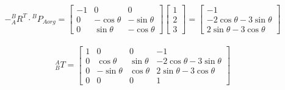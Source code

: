 \documentclass{article}
\begin{document}
\[
    -{}^{B}_{A}R^{T} \cdot {}^{B}P_{Aorg}
    =
    \begin{bmatrix}
        -1 & 0 & 0 \\
        0 & -\cos{\theta} & -\sin{\theta} \\
        0 & \sin{\theta} & -\cos{\theta}
    \end{bmatrix}
    \begin{bmatrix}
        1 \\
        2 \\
        3
    \end{bmatrix}
    =
    \begin{bmatrix}
        -1 \\
        -2\cos{\theta} - 3 \sin{\theta} \\
        2\sin{\theta} - 3 \cos{\theta}
    \end{bmatrix}
\]
\\
\[
    {}^{A}_{B}T = 
    \begin{bmatrix}
        1 & 0 & 0 & -1 \\
        0 & \cos{\theta} & \sin{\theta} & -2\cos{\theta} - 3 \sin{\theta} \\
        0 & -\sin{\theta} & \cos{\theta} & 2\sin{\theta} - 3 \cos{\theta} \\
        0 & 0 & 0 & 1
    \end{bmatrix}
\]
\end{document}
